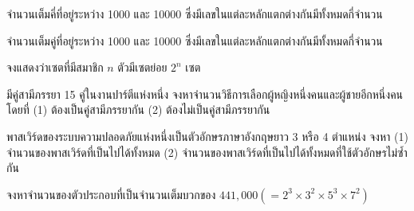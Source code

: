 \begin{exam}
	จำนวนเต็มคี่ที่อยู่ระหว่าง 1000 และ 10000 ซึ่งมีเลขในแต่ละหลักแตกต่างกันมีทั้งหมดกี่จำนวน
\end{exam}

\begin{exam}
	จำนวนเต็มคู่ที่อยู่ระหว่าง 1000 และ 10000 ซึ่งมีเลขในแต่ละหลักแตกต่างกันมีทั้งหมดกี่จำนวน
\end{exam}

\begin{exam}
	จงแสดงว่าเซตที่มีสมาชิก $ n $ ตัวมีเซตย่อย $ 2^n $ เซต
\end{exam}

\begin{exam}
	มีคู่สามีภรรยา 15 คู่ในงานปาร์ตีแห่งหนึ่ง จงหาจำนวนวิธีการเลือกผู้หญิงหนึ่งคนและผู้ชายอีกหนึ่งคนโดยที่ (1) ต้องเป็นคู่สามีภรรยากัน (2) ต้องไม่เป็นคู่สามีภรรยากัน
\end{exam}

\begin{exam}
	พาสเวิร์ดของระบบความปลอดภัยแห่งหนึ่งเป็นตัวอักษรภาษาอังกฤษยาว 3 หรือ 4 ตำแหน่ง จงหา (1) จำนวนของพาสเวิร์ดที่เป็นไปได้ทั้งหมด (2) จำนวนของพาสเวิร์ดที่เป็นไปได้ทั้งหมดที่ใช้ตัวอักษรไม่ซ้ำกัน
\end{exam}

\begin{exam}
	จงหาจำนวนของตัวประกอบที่เป็นจำนวนเต็มบวกของ $441,000 ( =2^3\times 3^2 \times 5^3 \times 7^2 )$
\end{exam}



